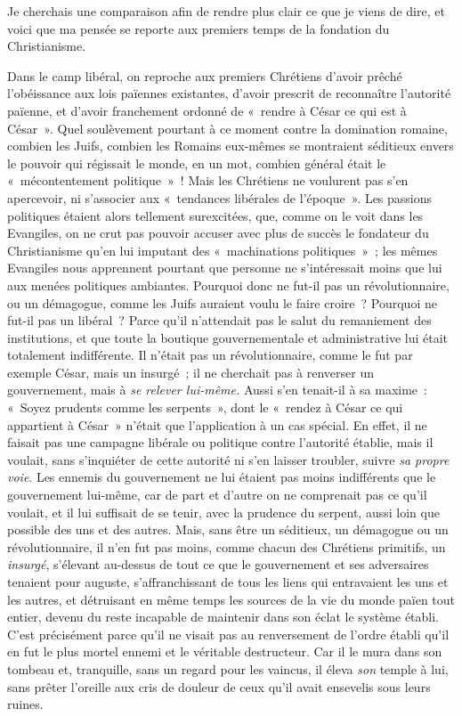 \documentclass[french,twoside]{book} %
\begin{document}
Je cherchais une comparaison afin de rendre plus clair ce que je viens de dire, et voici que ma pensée se reporte aux premiers temps de la fondation du Christianisme.\par
Dans le camp libéral, on reproche aux premiers Chrétiens d’avoir prêché l’obéissance aux lois païennes existantes, d’avoir prescrit de reconnaître l’autorité païenne, et d’avoir franchement ordonné de « rendre à César ce qui est à César ». Quel soulèvement pourtant à  ce moment contre la domination romaine, combien les Juifs, combien les Romains eux-mêmes se montraient séditieux envers le pouvoir qui régissait le monde, en un mot, combien général était le « mécontentement politique » ! Mais les Chrétiens ne voulurent pas s’en apercevoir, ni s’associer aux « tendances libérales de l’époque ». Les passions politiques étaient alors tellement surexcitées, que, comme on le voit dans les Evangiles, on ne crut pas pouvoir accuser avec plus de succès le fondateur du Christianisme qu’en lui imputant des « machinations politiques » ; les mêmes Evangiles nous apprennent pourtant que personne ne s’intéressait moins que lui aux menées politiques ambiantes. Pourquoi donc ne fut-il pas un révolutionnaire, ou un démagogue, comme les Juifs auraient voulu le faire croire ? Pourquoi ne fut-il pas un libéral ? Parce qu’il n’attendait pas le salut du remaniement des institutions, et que toute la boutique gouvernementale et administrative lui était totalement indifférente. Il n’était pas un révolutionnaire, comme le fut par exemple César, mais un insurgé ; il ne cherchait pas à renverser un gouvernement, mais à \emph{se relever lui-même.} Aussi s’en tenait-il à sa maxime : « Soyez prudents comme les serpents », dont le « rendez à César ce qui appartient à César » n’était que l’application à un cas spécial. En effet, il ne faisait pas une campagne libérale ou politique contre l’autorité établie, mais il voulait, sans s’inquiéter de cette autorité ni s’en laisser troubler, suivre \emph{sa propre voie}. Les ennemis du gouvernement ne lui étaient pas moins indifférents que le gouvernement lui-même, car de part et d’autre on ne comprenait pas ce qu’il voulait, et il lui suffisait de se tenir, avec la prudence du serpent, aussi loin que possible des uns et des autres. Mais, sans être un séditieux, un démagogue ou un révolutionnaire, il n’en fut pas moins, comme chacun des Chrétiens primitifs, un \emph{insurgé}, s’élevant au-dessus de tout ce que le gouvernement  et ses adversaires tenaient pour auguste, s’affranchissant de tous les liens qui entravaient les uns et les autres, et détruisant en même temps les sources de la vie du monde païen tout entier, devenu du reste incapable de maintenir dans son éclat le système établi. C’est précisément parce qu’il ne visait pas au renversement de l’ordre établi qu’il en fut le plus mortel ennemi et le véritable destructeur. Car il le mura dans son tombeau et, tranquille, sans un regard pour les vaincus, il éleva \emph{son} temple à lui, sans prêter l’oreille aux cris de douleur de ceux qu’il avait ensevelis sous leurs ruines.\par
\end{document}
